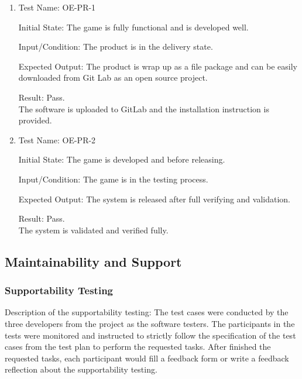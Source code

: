 \documentclass[12pt, titlepage]{article}
\begin{document}
\begin{enumerate}

\item{Test Name: OE-PR-1\\}

Initial State: The game is fully functional and is developed well.

Input/Condition: The product is in the delivery state.

Expected Output: The product is wrap up as a file package and can be easily downloaded from Git Lab as an open source project.

Result: Pass. \\The software is uploaded to GitLab and the installation instruction is provided.

\item{Test Name: OE-PR-2\\}

Initial State: The game is developed and before releasing.

Input/Condition: The game is in the testing process.

Expected Output: The system is released after full verifying and validation.

Result: Pass. \\The system is validated and verified fully.
\end{enumerate}

\subsection{Maintainability and Support}

\subsubsection{Supportability Testing}
Description of the supportability testing: The test cases were conducted by the three developers from the project as the software testers. The participants in the tests were monitored and instructed to strictly follow the specification of the test cases from the test plan to perform the requested tasks. After finished the requested tasks, each participant would fill a feedback form or write a feedback reflection about the supportability testing.
\end{document}
